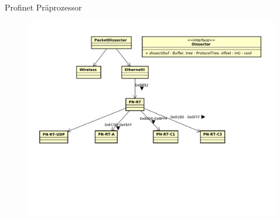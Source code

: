 \begin{frame}{Profinet Präprozessor}
    \begin{figure}
    	\centering
    	\includegraphics[width=\textwidth]{./images/dissector/5.pdf}
    \end{figure}
\end{frame}
